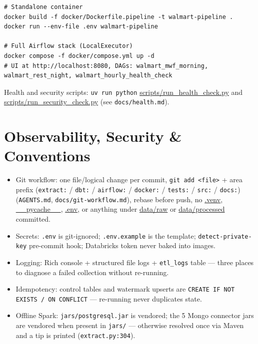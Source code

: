 \documentclass[11pt,a4paper]{article}
\begin{document}
\begin{lstlisting}[style=bash,caption={Docker \& Airflow}]
# Standalone container
docker build -f docker/Dockerfile.pipeline -t walmart-pipeline .
docker run --env-file .env walmart-pipeline

# Full Airflow stack (LocalExecutor)
docker compose -f docker/compose.yml up -d
# UI at http://localhost:8080, DAGs: walmart_mwf_morning, walmart_rest_night, walmart_hourly_health_check
\end{lstlisting}

Health and security scripts: \texttt{uv run python} \url{scripts/run_health_check.py} and \url{scripts/run_security_check.py} (see \texttt{docs/health.md}).

\section{Observability, Security \& Conventions}

\begin{itemize}[leftmargin=1.4em]
  \item Git workflow: one file/logical change per commit, \texttt{git add <file>} + area prefix (\texttt{extract:} / \texttt{dbt:} / \texttt{airflow:} / \texttt{docker:} / \texttt{tests:} / \texttt{src:} / \texttt{docs:}) (\texttt{AGENTS.md}, \texttt{docs/git-workflow.md}), rebase before push, no \url{.venv}, \url{__pycache__}, \url{.env}, or anything under \url{data/raw} or \url{data/processed} committed.
  \item Secrets: \texttt{.env} is git-ignored; \texttt{.env.example} is the template; \texttt{detect-private-key} pre-commit hook; Databricks token never baked into images.
  \item Logging: Rich console + structured file logs + \texttt{etl\_logs} table — three places to diagnose a failed collection without re-running.
  \item Idempotency: control tables and watermark upserts are \texttt{CREATE IF NOT EXISTS / ON CONFLICT} — re-running never duplicates state.
  \item Offline Spark: \texttt{jars/postgresql.jar} is vendored; the 5 Mongo connector jars are vendored when present in \texttt{jars/} — otherwise resolved once via Maven and a tip is printed (\texttt{extract.py:304}).
\end{itemize}

\end{document}
